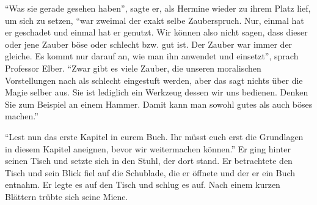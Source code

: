 \enquote{Was sie gerade gesehen haben}, sagte er, als Hermine wieder zu ihrem Platz lief, um sich zu setzen, \enquote{war zweimal der exakt selbe Zauberspruch. Nur, einmal hat er geschadet und einmal hat er genutzt. Wir können also nicht sagen, dass dieser oder jene Zauber böse oder schlecht bzw. gut ist. Der Zauber war immer der gleiche. Es kommt nur darauf an, wie man ihn anwendet und einsetzt}, sprach Professor Elber. \enquote{Zwar gibt es viele Zauber, die unseren moralischen Vorstellungen nach als schlecht eingestuft werden, aber das sagt nichts über die Magie selber aus. Sie ist lediglich ein Werkzeug dessen wir uns bedienen. Denken Sie zum Beispiel an einem Hammer. Damit kann man sowohl gutes als auch böses machen.}

\enquote{Lest nun das erste Kapitel in eurem Buch. Ihr müsst euch erst die Grundlagen in diesem Kapitel aneignen, bevor wir weitermachen können.} Er ging hinter seinen Tisch und setzte sich in den Stuhl, der dort stand. Er betrachtete den Tisch und sein Blick fiel auf die Schublade, die er öffnete und der er ein Buch entnahm. Er legte es auf den Tisch und schlug es auf. Nach einem kurzen Blättern trübte sich seine Miene.

